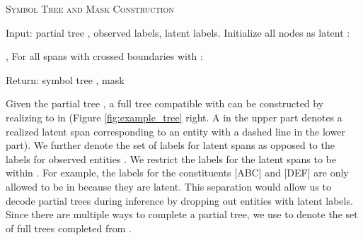 \begin{algorithm}[t!]
  \small
  \caption{\label{alg:build_mask} \textsc{Symbol Tree and Mask Construction}}
  \begin{algorithmic}[1]
  
  \State Input: partial tree ,  observed labels,  latent labels. 
  \State  Initialize all nodes as latent \scalebox{0.8}{}:
  \State {}
    \If{} 
      \State  
      \State ,  \label{alg:line_observed_mask}
\State  For all spans with crossed boundaries with :
      \State \begin{varwidth}[h]{\linewidth} \label{alg:line_rejected_mask_1}
        : \par
          \hskip\algorithmicindent   \par
        \end{varwidth}
\State \begin{varwidth}[h]{\linewidth} \label{alg:line_rejected_mask_2}
        : \par
          \hskip\algorithmicindent   \par
        \end{varwidth}
    \EndIf
  \EndFor

  \State Return: symbol tree , mask 
  
\end{algorithmic}
\end{algorithm} 
Given the partial tree , a full tree  compatible with  can be constructed by realizing \scalebox{0.8}{} to \scalebox{0.8}{} in 
(Figure \ref{fig:example_tree} right. A \scalebox{0.8}{} in the upper part denotes a realized latent span corresponding to an entity with a dashed line in the lower part). 
We further denote the set of labels for latent spans  as opposed to the labels for observed entities . 
We restrict the labels for the latent spans to be within . 
For example, the labels for the constituents [ABC] and [DEF] are only allowed to be in  because they are latent. 
This separation would allow us to decode partial trees during inference by dropping out entities with latent labels. 
Since there are multiple ways to complete a partial tree, we use  to denote the set of full trees completed from . 

